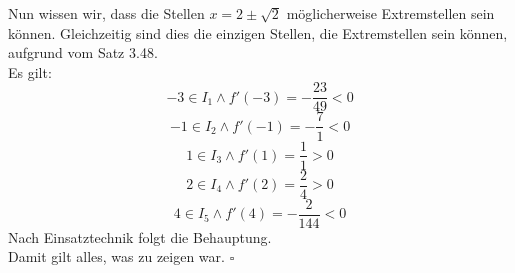 \documentclass[12pt, a4paper]{article}
\newcommand*{\qed}{\null\nobreak\hfill\ensuremath{\square}}
\begin{document}
Nun wissen wir, dass die Stellen \(x = 2 \pm \sqrt{2}\) möglicherweise Extremstellen sein können. Gleichzeitig sind dies die einzigen Stellen, die Extremstellen sein können, aufgrund vom Satz 3.48. \\
Es gilt: \[-3 \in I_1 \wedge f'(-3) = -\frac{23}{49} < 0\]
\[-1 \in I_2 \wedge f'(-1) = -\frac{7}{1} < 0\]
\[1 \in I_3 \wedge f'(1) = \frac{1}{1} > 0\]
\[2 \in I_4 \wedge f'(2) = \frac{2}{4} > 0\]
\[4 \in I_5 \wedge f'(4) = -\frac{2}{144} < 0\]
Nach Einsatztechnik folgt die Behauptung. \\
Damit gilt alles, was zu zeigen war. \qed \pagebreak
\end{document}
